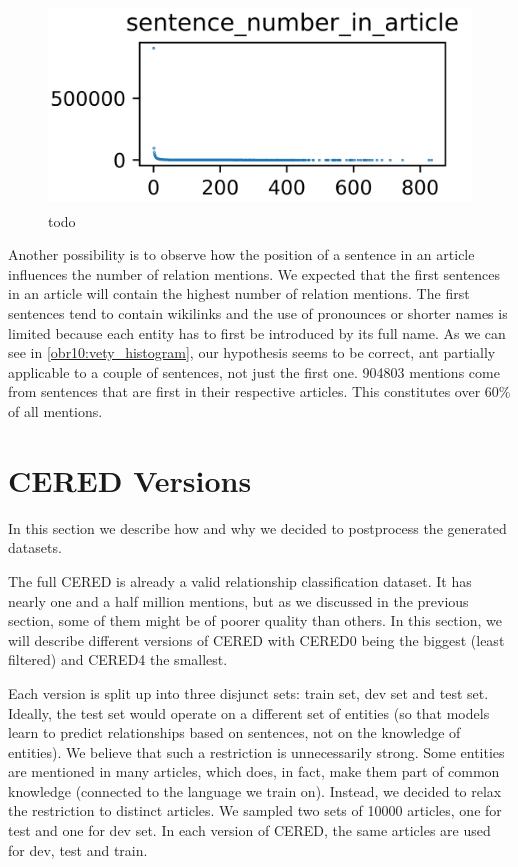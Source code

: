 \begin{figure}[h]\centering
\includegraphics[width=119mm, height=54mm]{./img/CERED0_sentence_number_histogram}
\caption{todo}
\label{obr10:vety_histogram}
\end{figure}


Another possibility is to observe how the position of a sentence in an article influences the number of relation mentions. We expected that the first sentences in an article will contain the highest number of relation mentions. The first sentences tend to contain wikilinks and the use of pronounces or shorter names is limited because each entity has to first be introduced by its full name. As we can see in \autoref{obr10:vety_histogram}, our hypothesis seems to be correct, ant partially applicable to a couple of sentences, not just the first one. 904803 mentions come from sentences that are first in their respective articles. This constitutes over 60\% of all mentions.





\section{CERED Versions}
In this section we describe how and why we decided to postprocess the generated datasets. 

The full CERED is already a valid relationship classification dataset. It has nearly one and a half million mentions, but as we discussed in the previous section, some of them might be of poorer quality than others. In this section, we will describe different versions of CERED with CERED0 being the biggest (least filtered) and CERED4 the smallest. 


Each version is split up into three disjunct sets: train set, dev set and test set. Ideally, the test set would operate on a different set of entities (so that models learn to predict relationships based on sentences, not on the knowledge of entities). We believe that such a restriction is unnecessarily strong. Some entities are mentioned in many articles, which does, in fact, make them part of common knowledge (connected to the language we train on). Instead, we decided to relax the restriction to distinct articles. We sampled two sets of 10000 articles, one for test and one for dev set. In each version of CERED, the same articles are used for dev, test and train.

